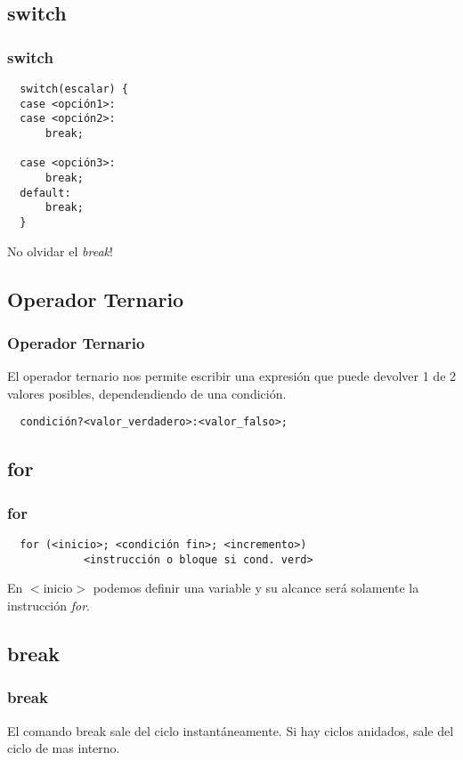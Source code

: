 \documentclass{beamer}
\begin{document}
\subsection{switch}

\begin{frame}[fragile]
\frametitle{switch}

\begin{verbatim}
  switch(escalar) {
  case <opción1>:
  case <opción2>:
      break;

  case <opción3>:
      break;
  default:
      break;
  }
\end{verbatim}

\begin{block}
 No olvidar el \emph{break}!
\end{block}

\end{frame}

\subsection{Operador Ternario}
\begin{frame}[fragile]
\frametitle{Operador Ternario}
El operador ternario nos permite escribir una expresión que puede devolver 1 de 2 valores posibles, dependendiendo de una condición.

\begin{verbatim}
  condición?<valor_verdadero>:<valor_falso>;
\end{verbatim}
 
\end{frame}

\subsection{for}
\begin{frame}[fragile]
\frametitle{for}
\begin{verbatim}
  for (<inicio>; <condición fin>; <incremento>) 
            <instrucción o bloque si cond. verd>
\end{verbatim}

En $<$inicio$>$ podemos definir una variable y su alcance será solamente la instrucción \emph{for}.
\end{frame}

\subsection{break}
\begin{frame}
\frametitle{break}
El comando break sale del ciclo instantáneamente. Si hay ciclos anidados, sale del ciclo de mas interno.
\end{frame}
\end{document}
